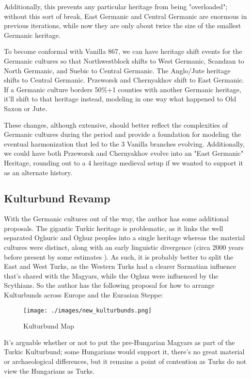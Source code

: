 \documentclass{article}
\begin{document}
	Additionally, this prevents any particular heritage from being "overloaded"; without this sort of break, East Germanic and Central Germanic are enormous in previous iterations, while now they are only about twice the size of the smallest Germanic heritage.
	
	To become conformal with Vanilla 867, we can have heritage shift events for the Germanic cultures so that Northwestblock shifts to West Germanic, Scandzan to North Germanic, and Suebic to Central Germanic.
	The Anglo/Jute heritage shifts to Central Germanic.
	Przeworsk and Chernyakhov shift to East Germanic.
	If a Germanic culture borders 50\%+1 counties with another Germanic heritage, it'll shift to that heritage instead, modeling in one way what happened to Old Saxon or Jute.
	
	These changes, although extensive, should better reflect the complexities of Germanic cultures during the period and provide a foundation for modeling the eventual harmonization that led to the 3 Vanilla branches evolving.
	Additionally, we could have both Przeworsk and Chernyakhov evolve into an "East Germanic" Heritage, rounding out to a 4 heritage medieval setup if we wanted to support it as an alternate history. 
	
	\subsection{Kulturbund Revamp}
	\label{sec:culture_review:subsec:kulturbunds}
	With the Germanic cultures out of the way, the author has some additional proposals.
	The gigantic Turkic heritage is problematic, as it links the well separated Oghuric and Oghuz peoples into a single heritage whereas the material cultures were distinct, along with an early linguistic divergence (circa 2000 years before present by some estimates \cite{TurkicComputationalLinguistics}). 
	As such, it is probably better to split the East and West Turks, as the Western Turks had a clearer Sarmatian influence that's shared with the Magyars, while the Oghuz were influenced by the Scythians.
	So the author has the following proposal for how to arrange Kulturbunds across Europe and the Eurasian Steppe:
	
	\begin{figure}[h!]
		\centering
		\texttt{[image: ./images/new\_kulturbunds.png]}
		\caption{Kulturbund Map}
	\end{figure}
	
	It's arguable whether or not to put the pre-Hungarian Magyars as part of the Turkic Kulturbund; some Hungarians would support it, there's no great material or archaeological differences, but it remains a point of contention as Turks do not view the Hungarians as Turks.
	
\end{document}
